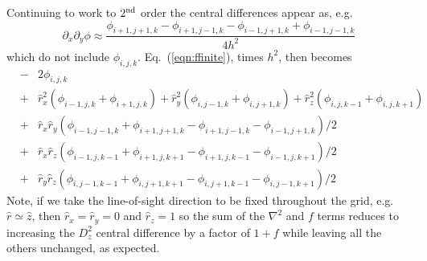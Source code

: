 \documentclass[a4paper,11pt]{article}
\begin{document}
Continuing to work to $2^{\rm nd}$ order the central differences appear as, e.g.
\begin{equation}
  \partial_x\partial_y\phi \approx
  \frac{\phi_{i+1,j+1,k}-\phi_{i+1,j-1,k}-\phi_{i-1,j+1,k}+\phi_{i-1,j-1,k}}
       {4h^2}
\end{equation}
which do not include $\phi_{i,j,k}$.
Eq.~(\ref{eqn:ffinite}), times $h^2$, then becomes
\begin{eqnarray}
  &-& 2\phi_{i,j,k} \nonumber \\
  &+&\hat{r}_x^2 \left( \phi_{i-1,j,k}+\phi_{i+1,j,k} \right)
   + \hat{r}_y^2 \left( \phi_{i,j-1,k}+\phi_{i,j+1,k} \right)
   + \hat{r}_z^2 \left( \phi_{i,j,k-1}+\phi_{i,j,k+1} \right)   \nonumber \\
  &+&\hat{r}_x\hat{r}_y\left( \phi_{i-1,j-1,k}+\phi_{i+1,j+1,k}
                             -\phi_{i+1,j-1,k}-\phi_{i-1,j+1,k} \right)/2
      \nonumber \\
  &+&\hat{r}_x\hat{r}_z\left( \phi_{i-1,j,k-1}+\phi_{i+1,j,k+1}
                             -\phi_{i+1,j,k-1}-\phi_{i-1,j,k+1} \right)/2
      \nonumber \\
  &+&\hat{r}_y\hat{r}_z\left( \phi_{i,j-1,k-1}+\phi_{i,j+1,k+1}
                             -\phi_{i,j+1,k-1}-\phi_{i,j-1,k+1} \right)/2
\end{eqnarray}
Note, if we take the line-of-sight direction to be fixed throughout the grid,
e.g.~$\hat{r}\simeq\hat{z}$, then $\hat{r}_x=\hat{r}_y=0$ and $\hat{r}_z=1$
so the sum of the $\nabla^2$ and $f$ terms reduces to increasing the $D_z^2$
central difference by a factor of $1+f$ while leaving all the others unchanged,
as expected.
\end{document}
